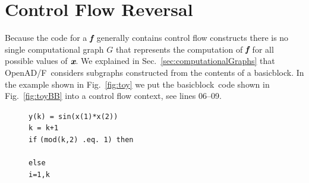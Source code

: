 \documentclass{book}
\newcommand{\basicblock}{basicblock}
\newcommand{\OpenADF}{OpenAD/F}
\newcommand{\bmf}{\mbox{\bf\em f}}
\newcommand{\bmx}{\mbox{\bf\em x}}
\newcommand{\refsec}[1]{{Sec.~\ref{#1}}}
\newcommand{\reffig}[1]{{Fig.~\ref{#1}}}
\begin{document}
\section{Control Flow Reversal} \label{sec:cfReversal}
Because the code for a $\bmf$ generally contains control flow constructs there is no 
single  computational graph 
$G$ that represents the computation of $\bmf$ for all possible values of $\bmx$.
We explained in \refsec{sec:computationalGraphs} that \OpenADF\ considers subgraphs constructed 
from the contents of a \basicblock.
In the example shown in \reffig{fig:toy} we put the \basicblock\ code shown in 
\reffig{fig:toyBB} into a control flow context, see lines 06--09.
\begin{figure}
  \begin{center}
    \begin{minipage}{.5\textwidth}
      \begin{tabbing}
        \hspace{.6cm}{\footnotesize \bf 00}\hspace{.5cm} {\tt y(k) = sin(x(1)*x(2))} \\
        \hspace{.6cm}{\footnotesize \bf 01}\hspace{.5cm} {\tt k    = k+1} \\
        \hspace{.6cm}{\footnotesize \bf 02}\hspace{.5cm} {\tt if} \={\tt (mod(k,2) .eq. 1) then } \\
        \hspace{.6cm}{\footnotesize \bf 03}\hspace{.5cm}   \\
        \hspace{.6cm}{\footnotesize \bf 04}\hspace{.5cm} {\tt else } \\
        \hspace{.6cm}{\footnotesize \bf 05}\hspace{.5cm}  \={\tt i=1,k } \\
        \hspace{.6cm}{\footnotesize \bf 06}\hspace{.5cm} \> \\
        \hspace{.6cm}{\footnotesize \bf 07}\hspace{.5cm} \> \\

\end{tabbing}
\end{minipage}
\end{center}
\end{figure}
\end{document}
